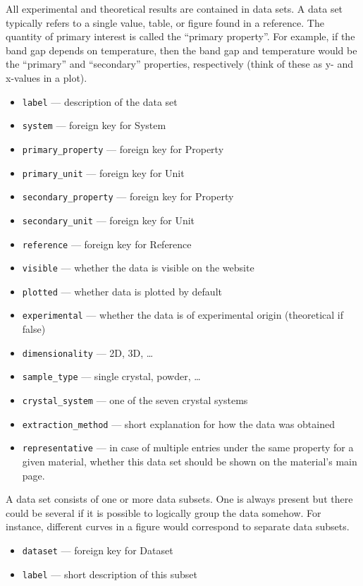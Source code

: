 \documentclass{article}
\begin{document}
All experimental and theoretical results are contained in data sets. A data set typically refers to a single value, table, or figure found in a reference. The quantity of primary interest is called the ``primary property''. For example, if the band gap depends on temperature, then the band gap and temperature would be the ``primary'' and ``secondary'' properties, respectively (think of these as y- and x-values in a plot).
\begin{tcolorbox}[colback=green!5,colframe=green!40!black,title=Dataset(Base)]
  \begin{itemize}
  \item \texttt{label} --- description of the data set
  \item \texttt{system} --- foreign key for System
  \item \texttt{primary\_property} --- foreign key for Property
  \item \texttt{primary\_unit} --- foreign key for Unit
  \item \texttt{secondary\_property} --- foreign key for Property
  \item \texttt{secondary\_unit} --- foreign key for Unit
  \item \texttt{reference} --- foreign key for Reference
  \item \texttt{visible} --- whether the data is visible on the website
  \item \texttt{plotted} --- whether data is plotted by default
  \item \texttt{experimental} --- whether the data is of experimental origin (theoretical if false)
  \item \texttt{dimensionality} --- 2D, 3D, \ldots
  \item \texttt{sample\_type} --- single crystal, powder, \ldots
  \item \texttt{crystal\_system} --- one of the seven crystal systems
  \item \texttt{extraction\_method} --- short explanation for how the data was obtained
  \item \texttt{representative} --- in case of multiple entries under the same property for a given material, whether this data set should be shown on the material's main page.
  \end{itemize}
\end{tcolorbox}

A data set consists of one or more data subsets. One is always present but there could be several if it is possible to logically group the data somehow. For instance, different curves in a figure would correspond to separate data subsets.
\begin{tcolorbox}[colback=green!5,colframe=green!40!black,title=Subset(Base)]
  \begin{itemize}
  \item \texttt{dataset} --- foreign key for Dataset
  \item \texttt{label} --- short description of this subset
  \end{itemize}
\end{tcolorbox}
\end{document}
